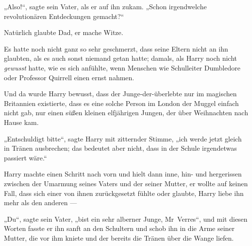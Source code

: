 „Also!“, sagte sein Vater, als er auf ihn zukam.
„Schon irgendwelche revolutionären Entdeckungen gemacht?“

Natürlich glaubte Dad, er mache Witze.

Es hatte noch nicht ganz so sehr geschmerzt, dass seine Eltern nicht an ihn glaubten, als es auch sonst niemand getan hatte; damals, als Harry noch nicht \emph{gewusst} hatte, wie es sich anfühlte, wenn Menschen wie Schulleiter Dumbledore oder Professor Quirrell einen ernst nahmen.

Und da wurde Harry bewusst, dass der Junge-der-überlebte nur im magischen Britannien existierte, dass es eine solche Person im London der Muggel einfach nicht gab, nur einen süßen kleinen elfjährigen Jungen, der über Weihnachten nach Hause kam.

„Entschuldigt bitte“, sagte Harry mit zitternder Stimme, „ich werde jetzt gleich in Tränen ausbrechen; das bedeutet aber nicht, dass in der Schule irgendetwas passiert wäre.“

Harry machte einen Schritt nach vorn und hielt dann inne, hin- und hergerissen zwischen der Umarmung seines Vaters und der seiner Mutter, er wollte auf keinen Fall, dass sich einer von ihnen zurückgesetzt fühlte oder glaubte, Harry liebe ihn mehr als den anderen —

„Du“, sagte sein Vater, „bist ein sehr alberner Junge, Mr~Verres“, und mit diesen Worten fasste er ihn sanft an den Schultern und schob ihn in die Arme seiner Mutter, die vor ihm kniete und der bereits die Tränen über die Wange liefen.

